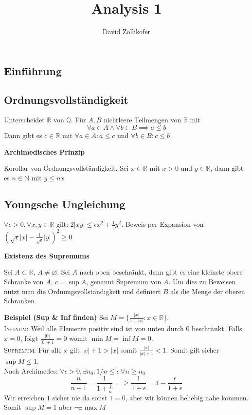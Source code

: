\documentclass[25pt]{sciposter}
\title{\huge{Analysis 1}}
\author{\large{David Zollikofer}}
\newcommand{\Q}{\mathbb{Q}}
\newcommand{\R}{\mathbb{R}}
\newcommand{\N}{\mathbb{N}}
\newenvironment{method}[1]{\begin{mdframed}[backgroundcolor=blue!10,innertopmargin=15pt, innerbottommargin=15pt]
		\textbf{#1 }
	}
	{ 
	\end{mdframed}
}
\begin{document}
\selectfont



\maketitle


\begin{multicols}{3}


\section{Einführung}

\subsection*{Ordnungsvollständigkeit}
Unterscheidet $\R$ von $\Q$. Für $A,B$ nichtleere Teilmengen von $\R$ mit $$\forall a\in A \land \forall b \in B \implies a \leq b$$
Dann gibt es $c \in \R$ mit $\forall a \in A : a \leq c$ und $\forall b \in B : c \leq b$

\begin{method}{Archimedisches Prinzip}
Korollar von Ordnungsvollständigkeit. Sei $x\in \R$ mit $x>0$ und $y \in \R$, dann gibt es $n\in \N$ mit $y \leq nx$
\end{method}

\subsection*{Youngsche Ungleichung}
$\forall \epsilon > 0 , \forall x,y\in \R$ gilt: $2 |xy| \leq \epsilon x^2 + \frac{1}{\epsilon} y^2$. Beweis per Expansion von $\left( \sqrt{\epsilon} |x| - \frac{1}{\sqrt{\epsilon}} |y| \right) ^2 \geq 0$

\begin{method}{Existenz des Supremums}
Sei $A \subset \R$, $A \not = \varnothing$. Sei $A$ nach oben beschränkt, dann gibt es eine kleinste obere Schranke von $A$, $c = \sup A$, genannt Supremum von $A$. Um dies zu Beweisen nutzt man die Ordnungsvollständigkeit und definiert $B$ als die Menge der oberen Schranken.
\end{method}
\textbf{Beispiel (Sup \& Inf finden)} Sei $M = \{ \frac{|x|}{1 + |x|} : x \in \mathbb{R}\}$. \\ \textsc{Infinum:} Weil alle Elemente positiv sind ist von unten durch 0 beschränkt. Falls $x = 0$, folgt $\frac{|0|}{|0|+1} =0$ womit $\min{M} = \inf{M} = 0$. \\
\textsc{Supremum:} Für alle $x$ gilt $|x| + 1 > |x|$ somit $\frac{|x|}{|x|+1} < 1$. Somit gilt sicher $\sup M \leq 1$. \\
Nach Archimedes: $\forall \epsilon > 0,\exists n_0 : 1/n \leq \epsilon \ \forall n \geq n_0$
$$\frac{n}{n+1} = \frac{1}{1 + \frac{1}{n}} =\geq \frac{1}{1 + \epsilon} = 1 - \frac{\epsilon}{1 + \epsilon}$$
Wir erreichen $1$ sicher nie da sonst $1 = 0$, aber wir können beliebig nahe kommen. Somit $\sup M = 1$ aber $\neg \exists \max M$


\end{multicols}
\end{document}
